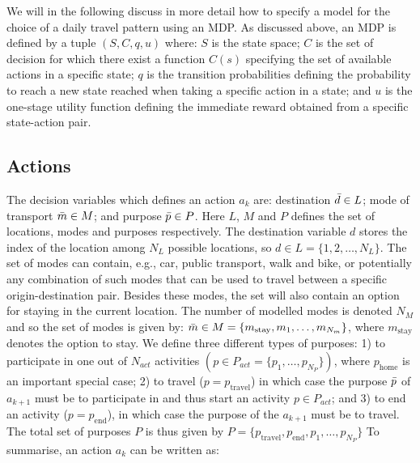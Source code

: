 We will in the following discuss in more detail how to specify a model for the choice of a daily travel pattern using an MDP. As discussed above, an MDP is defined by a tuple $(S,C,q,u)$ where: $S$ is the state space; $C$ is the set of decision for which there exist a function $C(s)$ specifying the set of available actions in a specific state; $q$ is the transition probabilities defining the probability to reach a new state reached when taking a specific action in a state; and $u$ is the one-stage utility function defining the immediate reward obtained from a specific state-action pair.

\subsection{Actions}
The decision variables which defines an action $a_k$ are: destination $\bar{d} \in L$; mode of transport $\bar{m} \in M$; and purpose $\bar{p} \in P$. Here $L$, $M$ and $P$ defines the set of locations, modes and purposes respectively.  The destination variable $d$ stores the index of the location among $N_L$ possible locations, so $d \in  L = \{1,2,\dots, N_L\}$. The set of modes can contain, e.g., car, public transport, walk and bike, or potentially any combination of such modes that can be used to travel between a specific origin-destination pair. Besides these modes, the set will also contain an option for staying in the current location. The number of modelled modes is denoted $N_M$ and so the set of modes is given by: $\bar{m} \in M = \{m_{\text{stay}},m_1,\dots,m_{N_m}\}$, where $m_{\text{stay}}$ denotes the option to stay. We define three different types of purposes: 1) to participate in one out of $N_{act}$ activities $(p\in P_{act} = \{p_1,\dots,p_{N_P}\})$, where $p_\text{home}$ is an important special case; 2) to travel ($p=p_{\text{travel}}$) in which case the purpose $\bar{p}$ of $a_{k+1}$ must be to participate in and thus start an activity $p \in P_{act}$; and 3) to end an activity ($p=p_{\text{end}}$), in which case the purpose of the $a_{k+1}$ must be to travel. The total set of purposes $P$ is thus given by $P = \{p_{\text{travel}},p_{\text{end}},p_1,\dots,p_{N_P}\}$
To summarise, an action $a_k$ can be written as: 
